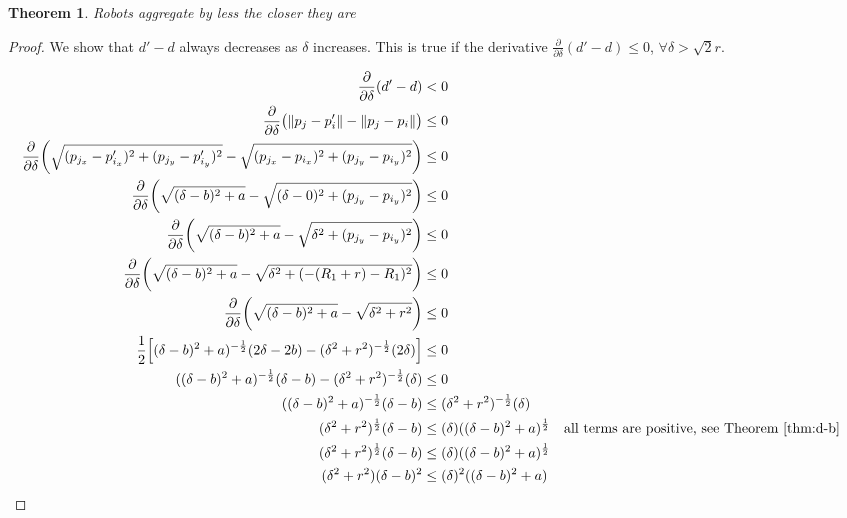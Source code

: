 \documentclass[conference]{IEEEtran}
\newtheorem{theorem}{Theorem}
\begin{document}
  \begin{theorem} \label{thm:d-d}
    Robots aggregate by less the closer they are
  \end{theorem}
  \begin{proof}

    We show that $d'-d$ always decreases as $\delta$ increases. This is true if the derivative $\frac{\partial}{\partial\delta}(d'-d) \leq 0$, $\forall \delta>\sqrt{2}r$.

    {%
      \setlength{\belowdisplayskip}{3pt}%
      \setlength{\abovedisplayskip}{3pt}%
      \begin{align*}
        \frac{\partial}{\partial\delta}(d'-d) &< 0 \\
        \frac{\partial}{\partial\delta}\big(\lVert p_j - p'_i \rVert - \lVert p_j - p_i \rVert\big) &\leq 0 \\
        \frac{\partial}{\partial\delta}\bigg(\sqrt{(p_{j_x} - p'_{i_x})^2 + (p_{j_y} - p'_{i_y})^2} - \sqrt{(p_{j_x} - p_{i_x})^2 + (p_{j_y} - p_{i_y})^2}\bigg) &\leq 0 \\
        \frac{\partial}{\partial\delta}\bigg(\sqrt{(\delta - b)^2 + a} - \sqrt{(\delta- 0)^2 + (p_{j_y} - p_{i_y})^2}\bigg) &\leq 0 \\
        \frac{\partial}{\partial\delta}\bigg(\sqrt{(\delta - b)^2 + a} - \sqrt{\delta^2 + (p_{j_y} - p_{i_y})^2}\bigg) &\leq 0 \\
        \frac{\partial}{\partial\delta}\bigg(\sqrt{(\delta-b)^2 + a} - \sqrt{\delta^2 + (-(R_1+r) - R_1)^2}\bigg) &\leq 0 \\
        \frac{\partial}{\partial\delta}\bigg(\sqrt{(\delta-b)^2 + a} - \sqrt{\delta^2 + r^2}\bigg) &\leq 0 \\
        \frac{1}{2}\Big[(\delta-b)^2 + a)^{-\frac{1}{2}}(2\delta-2b) - (\delta^2 + r^2)^{-\frac{1}{2}}(2\delta)\Big] &\leq 0 \\
        ((\delta-b)^2 + a)^{-\frac{1}{2}}(\delta-b) - (\delta^2 + r^2)^{-\frac{1}{2}}(\delta) &\leq 0 \\
        ((\delta-b)^2 + a)^{-\frac{1}{2}}(\delta-b) &\leq (\delta^2 + r^2)^{-\frac{1}{2}}(\delta) \\
        (\delta^2 + r^2)^{\frac{1}{2}}(\delta-b) &\leq (\delta)((\delta-b)^2 + a)^{\frac{1}{2}} && \text{all terms are positive, see Theorem \ref{thm:d-b}} \\
        (\delta^2 + r^2)^{\frac{1}{2}}(\delta-b) &\leq (\delta)((\delta-b)^2 + a)^{\frac{1}{2}} \\
        (\delta^2 + r^2)(\delta-b)^2 &\leq (\delta)^2((\delta-b)^2 + a) \\

\end{align*}}
\end{proof}
\end{document}
